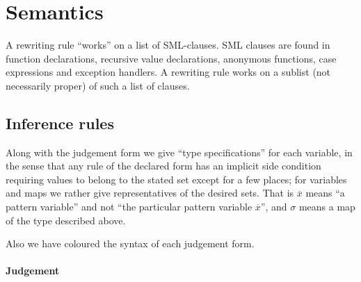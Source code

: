 
\section{Semantics}
A rewriting rule ``works'' on a list of SML-clauses. SML clauses are found in
function declarations, recursive value declarations, anonymous functions, case
expressions and exception handlers. A rewriting rule works on a sublist (not
necessarily proper) of such a list of clauses.


\subsection{Inference rules}
\def\TheTrueColour{BrickRed}

\newcommand{\cc}[1]{{\color{\TheTrueColour}#1}}
\newcommand{\subspat}[3]{\ensuremath{#1\cc{(}#2\cc{)}\mathrel{\cc{=}}#3}}
\newcommand{\matchpat}[3]{\ensuremath{#1\mathrel{\cc{:}}\cc{\langle}#2\cc{,}\mathrel{ }#3\cc{\rangle}}}
\newcommand{\matchbody}[4]{\ensuremath{#1\cc{,}\mathrel{ }#2\mathrel{\cc{|-}}#3\mathrel{\cc{:}}#4}}
\newcommand{\matchclause}[3]{\ensuremath{#1\mathrel{\cc{|-}}#2\mathrel{\cc{:}}#3}}
\newcommand{\rewrite}[4]{\ensuremath{#1\mathrel{\cc{,}}#2\mathrel{\cc{|-}}#3\mathrel{\cc{\curvearrowright}}#4}}
\newcommand{\becomesthrough}[3]{\ensuremath{#1\mathrel{\textsf{\cc{becomes}}}#2\mathrel{\textsf{\cc{through}}}#3}}

Along with the judgement form we give ``type specifications'' for each variable,
in the sense that any rule of the declared form has an implicit side condition
requiring values to belong to the stated set except for a few places; for
variables and maps we rather give representatives of the desired sets. That is
$\overline{x}$ means ``a pattern variable'' and not ``the particular pattern
variable $\overline{x}$'', and $\sigma$ means a map of the type described above.

Also we have \cc{coloured} the syntax of each judgement form.

\paragraph{Judgement} \fbox{\subspat{\sigma}{spat}{mpat}} \\


